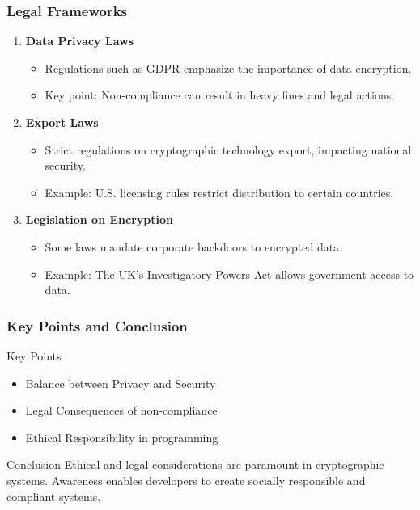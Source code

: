 \documentclass{beamer}
\begin{document}
\begin{frame}[fragile]
    \frametitle{Legal Frameworks}
    \begin{enumerate}
        \item \textbf{Data Privacy Laws}
            \begin{itemize}
                \item Regulations such as GDPR emphasize the importance of data encryption.
                \item Key point: Non-compliance can result in heavy fines and legal actions.
            \end{itemize}

        \item \textbf{Export Laws}
            \begin{itemize}
                \item Strict regulations on cryptographic technology export, impacting national security.
                \item Example: U.S. licensing rules restrict distribution to certain countries.
            \end{itemize}

        \item \textbf{Legislation on Encryption}
            \begin{itemize}
                \item Some laws mandate corporate backdoors to encrypted data.
                \item Example: The UK’s Investigatory Powers Act allows government access to data.
            \end{itemize}
    \end{enumerate}
\end{frame}

\begin{frame}[fragile]
    \frametitle{Key Points and Conclusion}
    \begin{block}{Key Points}
        \begin{itemize}
            \item Balance between Privacy and Security
            \item Legal Consequences of non-compliance
            \item Ethical Responsibility in programming
        \end{itemize}
    \end{block}
    
    \begin{block}{Conclusion}
        Ethical and legal considerations are paramount in cryptographic systems. Awareness enables developers to create socially responsible and compliant systems.
    \end{block}
\end{frame}
\end{document}
